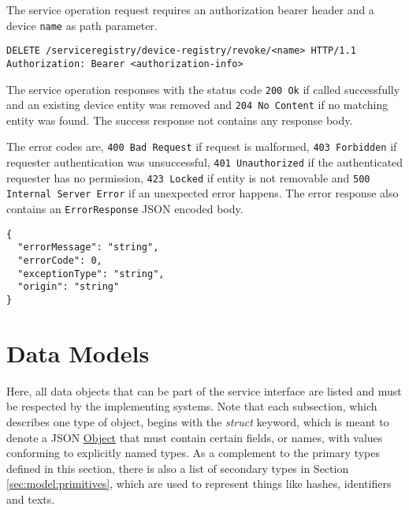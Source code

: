 \documentclass[a4paper]{arrowhead}
\newcommand{\fref}[1]{{\textcolor{ArrowheadBlue}{\hyperref[sec:functions:#1]{#1}}}}
\newcommand{\pref}[1]{{\textcolor{ArrowheadGrey}{\hyperref[sec:model:primitives:#1]{#1}}}}
\begin{document}

The service operation request requires an authorization bearer header and a device \texttt{name} as path parameter.

\begin{lstlisting}[language=http,label={lst:register},caption={A \fref{revoke} request.}]
DELETE /serviceregistry/device-registry/revoke/<name> HTTP/1.1
Authorization: Bearer <authorization-info>
\end{lstlisting}

The service operation responses with the status code \texttt{200 Ok} if called successfully and an existing device entity was removed and \texttt{204 No Content} if no matching entity was found. The success response not contains any response body.

The error codes are, \texttt{400 Bad Request} if request is malformed, \texttt{403 Forbidden} if requester authentication was unsuccessful, \texttt{401 Unauthorized} if the authenticated requester has no permission, \texttt{423 Locked} if entity is not removable and \texttt{500 Internal Server Error} if an unexpected error happens. The error response also contains an \texttt{ErrorResponse} JSON encoded body.

\begin{lstlisting}[language=http,label={lst:register_response},caption={A \fref{revoke} error response.}]
{
  "errorMessage": "string",
  "errorCode": 0,
  "exceptionType": "string",
  "origin": "string"
}
\end{lstlisting}

\newpage

\section{Data Models}
\label{sec:model}

Here, all data objects that can be part of the service interface are listed and must be respected by the implementing systems.
Note that each subsection, which describes one type of object, begins with the \textit{struct} keyword, which is meant to denote a JSON \pref{Object} that must contain certain fields, or names, with values conforming to explicitly named types.
As a complement to the primary types defined in this section, there is also a list of secondary types in Section \ref{sec:model:primitives}, which are used to represent things like hashes, identifiers and texts.

 
\end{document}
